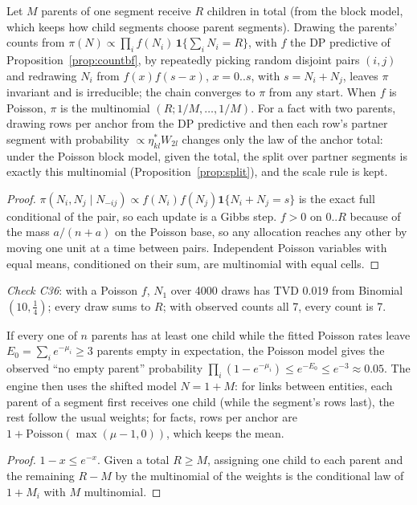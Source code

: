 \begin{proposition}\label{prop:condcounts}
Let $M$ parents of one segment receive $R$ children in total (from the block model, which keeps how child segments choose parent segments). Drawing the parents' counts from $\pi(N)\propto\prod_i f(N_i)\,\mathbf 1\{\sum_iN_i=R\}$, with $f$ the DP predictive of Proposition~\ref{prop:countbf}, by repeatedly picking random disjoint pairs $(i,j)$ and redrawing $N_i$ from $f(x)f(s-x)$, $x=0..s$, with $s=N_i+N_j$, leaves $\pi$ invariant and is irreducible; the chain converges to $\pi$ from any start. When $f$ is Poisson, $\pi$ is the multinomial $(R;1/M,\dots,1/M)$. For a fact with two parents, drawing rows per anchor from the DP predictive and then each row's partner segment with probability $\propto\eta^*_{kl}W_{2l}$ changes only the law of the anchor total: under the Poisson block model, given the total, the split over partner segments is exactly this multinomial (Proposition~\ref{prop:split}), and the scale rule is kept.
\end{proposition}
\begin{proof}
$\pi(N_i,N_j\mid N_{-ij})\propto f(N_i)f(N_j)\mathbf 1\{N_i+N_j=s\}$ is the exact full conditional of the pair, so each update is a Gibbs step. $f>0$ on $0..R$ because of the mass $a/(n+a)$ on the Poisson base, so any allocation reaches any other by moving one unit at a time between pairs. Independent Poisson variables with equal means, conditioned on their sum, are multinomial with equal cells.
\end{proof}
\noindent\emph{Check C36}: with a Poisson $f$, $N_1$ over 4000 draws has TVD 0.019 from Binomial$(10,\tfrac14)$; every draw sums to $R$; with observed counts all 7, every count is 7.

\begin{proposition}\label{prop:mandatory}
If every one of $n$ parents has at least one child while the fitted Poisson rates leave $E_0=\sum_ie^{-\mu_i}\ge3$ parents empty in expectation, the Poisson model gives the observed ``no empty parent'' probability $\prod_i(1-e^{-\mu_i})\le e^{-E_0}\le e^{-3}\approx0.05$. The engine then uses the shifted model $N=1+M$: for links between entities, each parent of a segment first receives one child (while the segment's rows last), the rest follow the usual weights; for facts, rows per anchor are $1+\mathrm{Poisson}(\max(\mu-1,0))$, which keeps the mean.
\end{proposition}
\begin{proof}
$1-x\le e^{-x}$. Given a total $R\ge M$, assigning one child to each parent and the remaining $R-M$ by the multinomial of the weights is the conditional law of $1+M_i$ with $M$ multinomial.
\end{proof}

